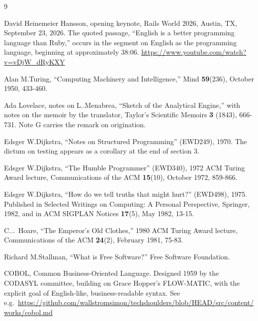 \documentclass[11pt]{article}
\begin{document}
\begin{thebibliography}{9}

 David Heinemeier Hansson, opening keynote,
Rails World 2026, Austin, TX, September 23, 2026. The quoted passage,
``English is a better programming language than Ruby,'' occurs in the
segment on English as the programming language, beginning at
approximately 38:06.
\url{https://www.youtube.com/watch?v=vDjW_dRyKXY}

 Alan M.\@ Turing, ``Computing Machinery and
Intelligence,'' Mind {\bf 59}(236), October 1950, 433-460.

 Ada Lovelace, notes on L.\@F.\@ Menabrea, ``Sketch of
the Analytical Engine,'' with notes on the memoir by the translator,
Taylor's Scientific Memoirs {\bf 3} (1843), 666-731. Note G carries the
remark on origination.

 Edsger W.\@ Dijkstra, ``Notes on Structured
Programming'' (EWD249), 1970. The dictum on testing appears as a
corollary at the end of section 3.

 Edsger W.\@ Dijkstra, ``The Humble Programmer''
(EWD340), 1972 ACM Turing Award lecture, Communications of the ACM
{\bf 15}(10), October 1972, 859-866.

 Edsger W.\@ Dijkstra, ``How do we tell truths that
might hurt?'' (EWD498), 1975. Published in Selected Writings on
Computing: A Personal Perspective, Springer, 1982, and in ACM SIGPLAN
Notices {\bf 17}(5), May 1982, 13-15.

 C.\@A.\@R.\ Hoare, ``The Emperor's Old Clothes,''
1980 ACM Turing Award lecture, Communications of the ACM {\bf 24}(2),
February 1981, 75-83.

 Richard M.\@ Stallman, ``What is Free Software?''
Free Software Foundation.

 COBOL, Common Business-Oriented Language. Designed
1959 by the CODASYL committee, building on Grace Hopper's FLOW-MATIC,
with the explicit goal of English-like, business-readable syntax.
See e.g.\
\url{https://github.com/wallstromsimon/techshoulders/blob/HEAD/src/content/works/cobol.md}

\end{thebibliography}
\end{document}
